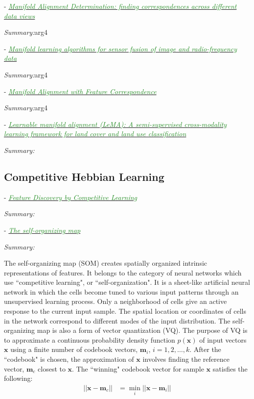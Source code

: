 \documentclass[]{article}
\newcommand{\paperentry}[4]{
            \hangindent=1cm
            \cite{#1} - \href{run:../References/#3}{\textcolor{ForestGreen}{\textit{#2}}}
            
            \noindent            
            \begin{minipage}[t]{0.1\linewidth}\hfill\end{minipage}
            \begin{minipage}[t]{0.8\linewidth}\textcolor{NavyBlue}{{\textit{Summary:}}}#4\end{minipage}
            \vspace{.25cm}
          }
\begin{document}
		
		\paperentry{Damianou2017ManifoldAlignmentDifferentDataView}
		{Manifold Alignment Determination: finding correspondences across different data views}
		{Manifold_Representation_Learning/Alignment/Damianou2017ManifoldAlignmentDifferentDataView.pdf}
		{arg4}
		
		\paperentry{Shen2018ManifoldSensorFusionImageData}
		{Manifold learning algorithms for sensor fusion of image and radio-frequency data}
		{Manifold_Representation_Learning/Alignment/Shen2018ManifoldSensorFusionImageData.pdf}
		{arg4}
		
		\paperentry{Stanley2019ManAlignmentFeatureCorrespondence}
		{Manifold Alignment with Feature Correspondence}
		{Manifold_Representation_Learning/Alignment/Stanley2019ManAlignmentFeatureCorrespondence.pdf}
		{arg4}
		
		\paperentry{Hong2019LearnableManifoldAlignment}
		{Learnable manifold alignment (LeMA): A semi-supervised cross-modality learning framework for land cover and land use classification}
		{Manifold_Representation_Learning/Alignment/Hong2019LearnableManifoldAlignment.pdf}
		{}
	
	
	\subsection{Competitive Hebbian Learning}
	
	\paperentry
	{Rumelhart1985CHL}
	{Feature Discovery by Competitive Learning}
	{Manifold_Representation_Learning/CHL/Rumelhart1985CHL.pdf}
	{}
	
	\paperentry{Kohonen1990SOM}
	{The self-organizing map}
	{Manifold_Representation_Learning/CHL/Kohonen1990SOM.pdf}
	{}
	\newline
	The self-organizing map (SOM) creates spatially organized intrinsic representations of features.  It belongs to the category of neural networks which use ``competitive learning", or ``self-organization".  It is a sheet-like artificial neural network in which the cells become tuned to various input patterns through an unsupervised learning process.  Only a neighborhood of cells give an active response to the current input sample.  The spatial location or coordinates of cells in the network correspond to different modes of the input distribution. The self-organizing map is also a form of vector quantization (VQ).  The purpose of VQ is to approximate a continuous probability density function $p(\bm{x})$ of input vectors $\bm{x}$ using a finite number of codebook vectors, $\bm{m}_i$, $i=1,2,\dots,k$.  After the ``codebook" is chosen, the approximation of $\bm{x}$ involves finding the reference vector, $\bm{m}_c$ closest to $\bm{x}$.  The ``winning" codebook vector for sample $\bm{x}$ satisfies the following:
	\begin{align*}
		|| \bm{x} - \bm{m}_c|| &= \min_{i}|| \bm{x} - \bm{m}_{i} ||
	\end{align*}	
	\noindent
	
\end{document}
